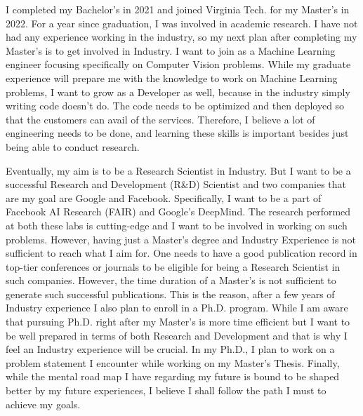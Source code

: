 \documentclass[11pt]{article}
\begin{document}
I completed my Bachelor's in 2021 and joined  Virginia Tech. for my Master's in 2022. For a year since graduation, I was involved in academic research. I have not had any experience working in the industry, so my next plan after completing my Master's is to get involved in Industry. I want to join as a Machine Learning engineer focusing specifically on Computer Vision problems. While my graduate experience will prepare me with the knowledge to work on Machine Learning problems, I want to grow as a Developer as well, because in the industry simply writing code doesn't do. The code needs to be optimized and then deployed so that the customers can avail of the services. Therefore, I believe a lot of engineering needs to be done, and learning these skills is important besides just being able to conduct research. \par
Eventually, my aim is to be a Research Scientist in Industry. But I want to be a successful Research and Development (R\&D) Scientist and two companies that are my goal are Google and Facebook. Specifically, I want to be a part of Facebook AI Research (FAIR) and Google's DeepMind. The research performed at both these labs is cutting-edge and I want to be involved in working on such problems. However, having just a Master's degree and Industry Experience is not sufficient to reach what I aim for. One needs to have a good publication record in top-tier conferences or journals to be eligible for being a Research Scientist in such companies. However, the time duration of a Master's is not sufficient to generate such successful publications. This is the reason, after a few years of Industry experience I also plan to enroll in a Ph.D. program. While I am aware that pursuing Ph.D. right after my Master's is more time efficient but I want to be well prepared in terms of both Research and Development and that is why I feel an Industry experience will be crucial. In my Ph.D., I plan to work on a problem statement I encounter while working on my Master's Thesis. Finally, while the mental road map I have regarding my future is bound to be shaped better by my future experiences, I believe I shall follow the path I must to achieve my goals. 
\end{document}
